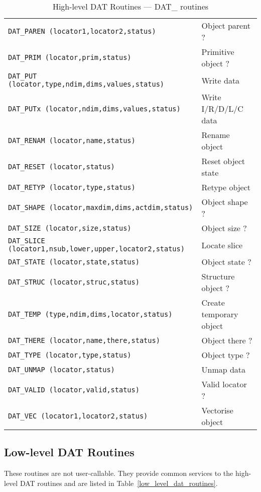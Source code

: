 \begin {table}[htbp]
\begin {center}
\begin {tabular}{||l|l||}
{\tt DAT\_PAREN (locator1,locator2,status)}		& Object parent ? \\
{\tt DAT\_PRIM (locator,prim,status)}			& Primitive object ? \\
{\tt DAT\_PUT (locator,type,ndim,dims,values,status)}	& Write data \\
{\tt DAT\_PUTx (locator,ndim,dims,values,status)}	& Write I/R/D/L/C data \\
{\tt DAT\_RENAM (locator,name,status)}			& Rename object \\
{\tt DAT\_RESET (locator,status)}			& Reset object state \\
{\tt DAT\_RETYP (locator,type,status)}			& Retype object \\
{\tt DAT\_SHAPE (locator,maxdim,dims,actdim,status)}	& Object shape ? \\
{\tt DAT\_SIZE (locator,size,status)}			& Object size ? \\
{\tt DAT\_SLICE (locator1,nsub,lower,upper,locator2,status)} & Locate slice \\
{\tt DAT\_STATE (locator,state,status)}			& Object state ? \\
{\tt DAT\_STRUC (locator,struc,status)}			& Structure object ? \\
{\tt DAT\_TEMP (type,ndim,dims,locator,status)}		& Create temporary object \\
{\tt DAT\_THERE (locator,name,there,status)}		& Object there ? \\
{\tt DAT\_TYPE (locator,type,status)}			& Object type ? \\
{\tt DAT\_UNMAP (locator,status)}			& Unmap data \\
{\tt DAT\_VALID (locator,valid,status)}			& Valid locator ? \\
{\tt DAT\_VEC (locator1,locator2,status)}		& Vectorise object \\
\hline
\end {tabular}
\caption {High-level DAT Routines --- DAT\_ routines}
\label {high_level_dat_routines_dat_routines}
\end {center}
\end {table}

\subsection {Low-level DAT Routines}

These routines are not user-callable. They provide common services to the
high-level DAT routines and are listed in Table~\ref{low_level_dat_routines}.

